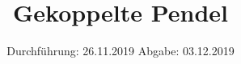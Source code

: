 

\subject{Versuchsnummer: 106}
\title{Gekoppelte Pendel}
\date{%
  Durchführung: 26.11.2019
  \hspace{3em}
  Abgabe: 03.12.2019
}



\maketitle
\thispagestyle{empty}
\tableofcontents
\newpage




%
\newpage
\nocite{*}
\printbibliography


